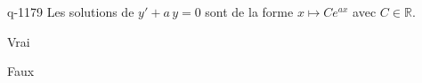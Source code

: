 \begin{truefalse}{q-1179}
Les solutions de $y'+a\,y=0$ sont de la forme $x\mapsto C e^{ax}$ avec $C\in\mathbb{R}$.
\item Vrai
\item* Faux
\end{truefalse}

